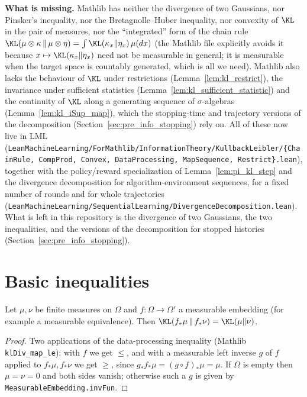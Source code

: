 \textbf{What is missing.} Mathlib has neither the divergence of two Gaussians, nor Pinsker's
inequality, nor the Bretagnolle--Huber inequality, nor convexity of $\KL$ in the pair of
measures, nor the ``integrated'' form of the chain rule
$\KL(\mu\otimes\kappa\,\|\,\mu\otimes\eta) = \int \KL(\kappa_x\|\eta_x)\,\mu(dx)$ (the Mathlib file
explicitly avoids it because $x \mapsto \KL(\kappa_x\|\eta_x)$ need not be measurable in
general; it is measurable when the target space is countably generated, which is all we need).
Mathlib also lacks the behaviour of $\KL$ under restrictions (Lemma~\ref{lem:kl_restrict}), the
invariance under sufficient statistics (Lemma~\ref{lem:kl_sufficient_statistic}) and the
continuity of $\KL$ along a generating sequence of $\sigma$-algebras
(Lemma~\ref{lem:kl_iSup_map}), which the stopping-time and trajectory versions of the
decomposition (Section~\ref{sec:pre_info_stopping}) rely on. All of these now live in LML
(\texttt{LeanMachineLearning/ForMathlib/InformationTheory/KullbackLeibler/\{ChainRule, CompProd,
Convex, DataProcessing, MapSequence, Restrict\}.lean}), together with the policy/reward
specialization of Lemma~\ref{lem:pi_kl_step} and the divergence decomposition for
algorithm-environment sequences, for a fixed number of rounds and for whole trajectories
(\texttt{LeanMachineLearning/SequentialLearning/DivergenceDecomposition.lean}). What is left in
this repository is the divergence of two Gaussians, the two inequalities, and the versions of
the decomposition for stopped histories (Section~\ref{sec:pre_info_stopping}).

\section{Basic inequalities}
\label{sec:pre_info_basic}

\begin{lemma}\label{lem:pi_kl_measurable_equiv}
\leanok
Let $\mu,\nu$ be finite measures on $\Omega$ and $f : \Omega \to \Omega'$ a measurable embedding
(for example a measurable equivalence). Then $\KL(f_*\mu \,\|\, f_*\nu) = \KL(\mu\|\nu)$.
\end{lemma}

\begin{proof}
\leanok
Two applications of the data-processing inequality (Mathlib \texttt{klDiv\_map\_le}): with
$f$ we get $\le$, and with a measurable left inverse $g$ of $f$ applied to $f_*\mu, f_*\nu$ we get
$\ge$, since $g_*f_*\mu = (g \circ f)_*\mu = \mu$. If $\Omega$ is empty then $\mu = \nu = 0$ and
both sides vanish; otherwise such a $g$ is given by \texttt{MeasurableEmbedding.invFun}.
\end{proof}

